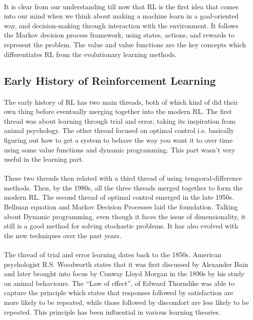 \documentclass{article}
\begin{document}
    \paragraph{} It is clear from our understanding till now that RL is the first idea that comes into our mind when we think about making a machine learn in a goal-oriented way, and decision-making through interaction with the environment. It follows the Markov decision process framework, using states, actions, and rewards to represent the problem. The value and value functions are the key concepts which differentiates RL from the evolutionary learning methods.
  
  \iffalse
  \subsection{Early History of Reinforcement Learning}
    \paragraph{}The early history of RL has two main threads, both of which kind of did their own thing before eventually merging together into the modern RL. The first thread was about learning through trial and error, taking its inspiration from animal psychology. The other thread focused on optimal control i.e. basically figuring out how to get a system to behave the way you want it to over time using some value functions and dynamic programming. This part wasn’t very useful in the learning part.
    \paragraph{}These two threads then related with a third thread of using temporal-difference methods. Then, by the 1980s, all the three threads merged together to form the modern RL. The second thread of optimal control emerged in the late 1950s. Bellman equation and Markov Decision Processes laid the foundation. Talking about Dynamic programming, even though it faces the issue of dimensionality, it still is a good method for solving stochastic problems. It has also evolved with the new techniques over the past years.
    \paragraph{}The thread of trial and error learning dates back to the 1850s. American psychologist R.S. Woodworth states that it was first discussed by Alexander Bain and later brought into focus by Conway Lloyd Morgan in the 1890s by his study on animal behaviours. The “Law of effect”, of Edward Thorndike was able to capture the principle which states that responses followed by satisfaction are more likely to be repeated, while those followed by discomfort are less likely to be repeated. This principle has been influential in various learning theories. 
\end{document}
